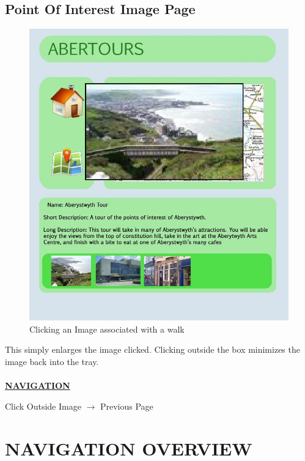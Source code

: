 \documentclass[12pt]{article}
\begin{document}
\subsection{Point Of Interest Image Page}
\begin{figure}[htp]
\centering
\includegraphics[scale=0.50]{Project_Plan/Web/walk_image_clicked_01.jpg}
\caption{Clicking an Image associated with a walk}
\label{Clicking an Image associated with a walk}
\end{figure}
\par{This simply enlarges the image clicked. Clicking outside the box minimizes the image back into the tray. \\ \\}
\textbf{\uline{NAVIGATION}}
\par{Click Outside Image $\rightarrow$ Previous Page}
\newpage
\section{NAVIGATION OVERVIEW}
\end{document}
